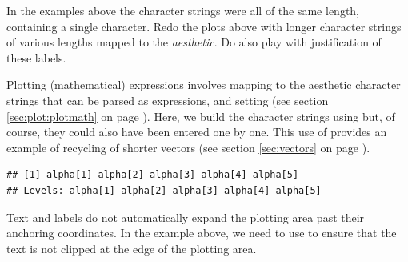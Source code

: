 \documentclass[krantz2]{krantz}\usepackage{knitr}
\begin{document}
\begin{playground}
In the examples above the character strings were all of the same length, containing a single character. Redo the plots above with longer character strings of various lengths mapped to the  \emph{aesthetic}. Do also play with justification of these labels.
\end{playground}

Plotting (mathematical) expressions involves mapping to the  aesthetic character strings that can be parsed as expressions, and setting  (see section \ref{sec:plot:plotmath} on page \pageref{sec:plot:plotmath}). Here, we build the character strings using  but, of course, they could also have been entered one by one. This use of  provides an example of recycling of shorter vectors (see section \ref{sec:vectors} on page \pageref{sec:vectors}).

\begin{knitrout}\footnotesize
{}\color{fgcolor}\begin{kframe}
\begin{alltt}
 \hlkwb{<-}
  \hlstd{(} \hlstd{=} \hlopt{:}\hlstd{,}  \hlstd{=} \hlstd{(}\hlstd{,} \hlstd{),}  \hlstd{=} \hlstd{(}\hlstr{"alpha["}\hlstd{,} \hlopt{:}\hlstd{,} \hlstr{"]"}\hlstd{,}  \hlstd{=} \hlstd{))}
\hlopt{$}
\end{alltt}
\begin{verbatim}
## [1] alpha[1] alpha[2] alpha[3] alpha[4] alpha[5]
## Levels: alpha[1] alpha[2] alpha[3] alpha[4] alpha[5]
\end{verbatim}
\end{kframe}
\end{knitrout}

Text and labels do not automatically expand the plotting area past their anchoring coordinates. In the example above, we need to use  to ensure that the text is not clipped at the edge of the plotting area.
\end{document}
